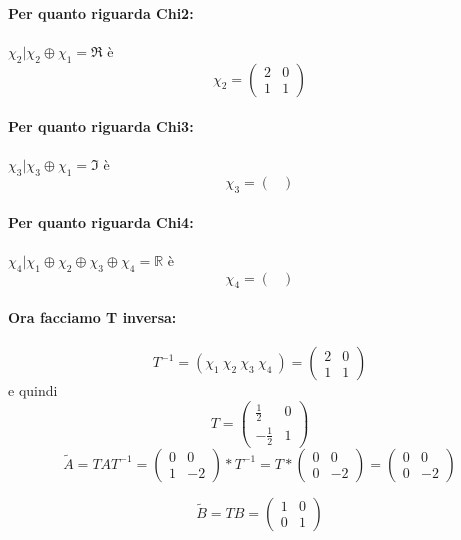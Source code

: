 \documentclass{article}
\begin{document}
\paragraph{Per quanto riguarda Chi2:} $ \chi_2 | \chi_2 \oplus \chi_1 = \mathfrak{R} $ è \[ \chi_2 = \left(\begin{matrix}2 & 0\\1 & 1\end{matrix}\right) \]

\paragraph{Per quanto riguarda Chi3:} $ \chi_3 | \chi_3 \oplus \chi_1 = \mathfrak{I} $ è \[ \chi_3 = \left(\begin{matrix}\end{matrix}\right) \]

\paragraph{Per quanto riguarda Chi4:} $ \chi_4 | \chi_1 \oplus \chi_2 \oplus  \chi_3 \oplus \chi_4 = \mathbb{R} $ è \[ \chi_4 = \left(\begin{matrix}\end{matrix}\right) \]
\paragraph{Ora facciamo T inversa:} \[ T^{-1} = (\chi_1\ \chi_2\ \chi_3\ \chi_4\ ) = \left(\begin{matrix}2 & 0\\1 & 1\end{matrix}\right) \]
e quindi \[T = \left(\begin{matrix}\frac{1}{2} & 0\\- \frac{1}{2} & 1\end{matrix}\right)\]
\[ \widetilde{A} = TAT^{-1} = \left(\begin{matrix}0 & 0\\1 & -2\end{matrix}\right) * T^{-1} = T*\left(\begin{matrix}0 & 0\\0 & -2\end{matrix}\right) =\left(\begin{matrix}0 & 0\\0 & -2\end{matrix}\right) \]

\[ \widetilde{B} = T B = \left(\begin{matrix}1 & 0\\0 & 1\end{matrix}\right) \]
\end{document}
